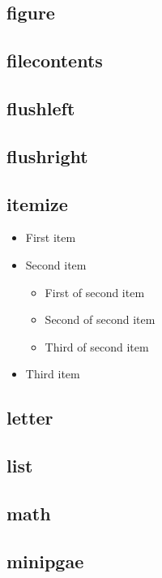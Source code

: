 \documentclass[11pt]{article}
\begin{document}
\subsection{figure}%

\subsection{filecontents}%

\subsection{flushleft}%

\subsection{flushright}%

\subsection{itemize}
\begin{itemize}
    \item First item
    \item Second item
        \begin{itemize}
            \item First of second item
            \item Second of second item
            \item Third of second item
        \end{itemize}
    \item Third item
\end{itemize}

\subsection{letter} %

\subsection{list} %

\subsection{math} %

\subsection{minipgae} %
\end{document}
